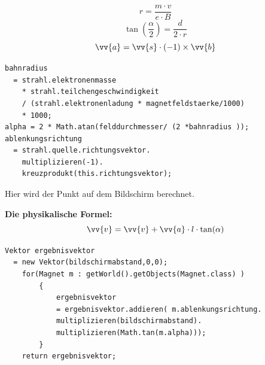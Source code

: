 $$ r = \frac{m \cdot v}{e \cdot B}$$
$$ \tan(\frac{\alpha}{2}) = \frac{d}{2 \cdot r}$$
$$ \vv{a} = \vv{s} \cdot (-1) \times \vv{b}$$
\begin{lstlisting}
bahnradius
  = strahl.elektronenmasse
    * strahl.teilchengeschwindigkeit
    / (strahl.elektronenladung * magnetfeldstaerke/1000)
    * 1000;
alpha = 2 * Math.atan(felddurchmesser/ (2 *bahnradius ));
ablenkungsrichtung
  = strahl.quelle.richtungsvektor.
    multiplizieren(-1).
    kreuzprodukt(this.richtungsvektor);
\end{lstlisting}


Hier wird der Punkt auf dem Bildschirm berechnet.

\textbf{Die physikalische Formel:}
$$ \vv{v} = \vv{v} + \vv{a} \cdot l \cdot \tan(\alpha)$$
\begin{lstlisting}
Vektor ergebnisvektor 
  = new Vektor(bildschirmabstand,0,0);
    for(Magnet m : getWorld().getObjects(Magnet.class) )
        {
            ergebnisvektor 
            = ergebnisvektor.addieren( m.ablenkungsrichtung.
            multiplizieren(bildschirmabstand).
            multiplizieren(Math.tan(m.alpha)));
        }
    return ergebnisvektor;
\end{lstlisting}
 
